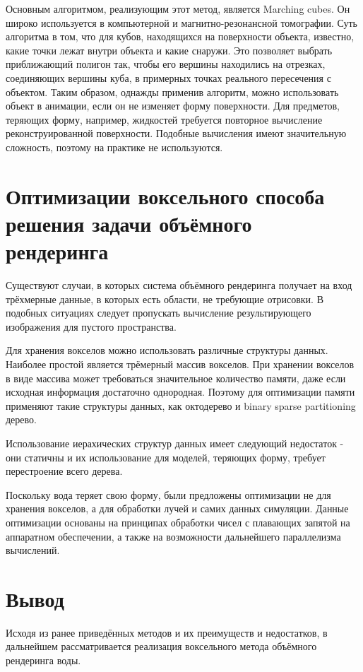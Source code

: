 Основным алгоритмом, реализующим этот метод, является Marching cubes.
Он широко используется в компьютерной и магнитно-резонансной томографии\cite{site:marchingcubes}.
Суть алгоритма в том, что для кубов, находящихся на поверхности объекта, известно,
какие точки лежат внутри объекта и какие снаружи. Это позволяет выбрать
приближающий полигон так, чтобы его вершины находились на отрезках, соединяющих вершины куба,
в примерных точках реального пересечения с объектом.
Таким образом, однажды применив алгоритм, можно использовать объект в анимации, если
он не изменяет форму поверхности.
Для предметов, теряющих форму, например, жидкостей требуется повторное вычисление
реконструированной поверхности. Подобные вычисления имеют значительную сложность,
поэтому на практике не используются\cite{book:ash}.


\section{Оптимизации воксельного способа решения задачи объёмного рендеринга}

Существуют случаи, в которых система объёмного рендеринга получает на вход трёхмерные данные, в
 которых есть области, не требующие отрисовки. В подобных ситуациях следует пропускать вычисление
 результирующего изображения для пустого пространства\cite{article:asvo}.

Для хранения вокселов можно использовать различные структуры данных. Наиболее простой является
трёмерный массив вокселов. При хранении вокселов в виде массива может требоваться значительное
количество памяти, даже если исходная информация достаточно однородная.
Поэтому для оптимизации памяти применяют такие структуры данных, как октодерево и binary sparse
partitioning дерево\cite{article:asvo}.

Использование иерахических структур данных имеет следующий недостаток - они статичны и их
использование для моделей, теряющих форму, требует перестроение всего дерева\cite{article:asvo}.

Поскольку вода теряет свою форму, были предложены оптимизации не для хранения вокселов, а для
обработки лучей и самих данных симуляции. Данные оптимизации основаны на принципах обработки
чисел с плавающих запятой на аппаратном обеспечении, а также на возможности дальнейшего
параллелизма вычислений\cite{book:ash}.

\section{Вывод}

Исходя из ранее приведённых методов и их преимуществ и недостатков, в дальнейшем
рассматривается реализация воксельного метода объёмного рендеринга воды.


